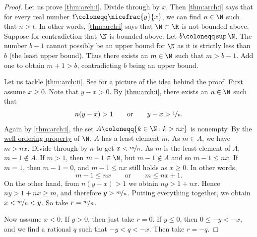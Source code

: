 \begin{proof}
Let us prove \ref{thm:arch:i}.  Divide through by $x$.
Then \ref{thm:arch:i} says that for every real number $t\coloneqq \nicefrac{y}{x}$,
we can find $n \in \N$ such that $n > t$.  In other words,
\ref{thm:arch:i} says that $\N \subset \R$ is not bounded above.
Suppose for contradiction that $\N$ is bounded above.  Let $b \coloneqq \sup \N$.
The number $b-1$ cannot possibly be an upper bound for $\N$ as it is strictly
less than $b$ (the least upper bound).  Thus there exists an $m \in \N$ such that $m > b-1$.
Add one to obtain $m+1 > b$, contradicting $b$ being an
upper bound.

\begin{myfigureht}
\caption{Idea of the proof of the density of $\Q$: Find $n$ such that $y-x >
\nicefrac{1}{n}$, then take the least $m$ such that $\nicefrac{m}{n} > x$.\label{figdensofQ}}
\end{myfigureht}
Let us tackle \ref{thm:arch:ii}.
See 
for a picture of the idea behind the proof.
First assume $x \geq 0$.
Note that $y-x > 0$.
By \ref{thm:arch:i}, there exists an $n \in \N$ such that
\begin{equation*}
n(y-x) > 1
\qquad \text{or} \qquad
y-x > \nicefrac{1}{n}.
\end{equation*}
Again by \ref{thm:arch:i}, the set
$A \coloneqq \{ k \in \N : k > nx \}$ is nonempty.  By the
\hyperlink{wop:link}{well ordering property}
of $\N$, $A$ has a least element $m$.
As $m \in A$, we have $m > nx$.
Divide through by $n$ to get $x < \nicefrac{m}{n}$.
As $m$ is the least
element of $A$, $m-1 \notin A$.
If $m > 1$, then $m-1 \in \N$, but $m-1 \notin A$ and so $m-1 \leq nx$.
If $m=1$,
then $m-1 = 0$, and $m-1 \leq nx$ still holds as $x \geq 0$.
In other words,
\begin{equation*}
m-1 \leq nx \qquad \text{or} \qquad m \leq nx+1 .
\end{equation*}
On the other hand,
from $n(y-x) > 1$ we obtain $ny > 1+nx$.
Hence $ny > 1+nx \geq m$, and therefore $y > \nicefrac{m}{n}$.
Putting everything together, we obtain $x < \nicefrac{m}{n} < y$.
So take $r = \nicefrac{m}{n}$.

Now assume $x < 0$.  If $y > 0$, then just take $r=0$.  If
$y \leq 0$, then $0 \leq -y < -x$, and we
find a rational $q$ such that $-y < q < -x$.  Then take $r = -q$.
\end{proof}




